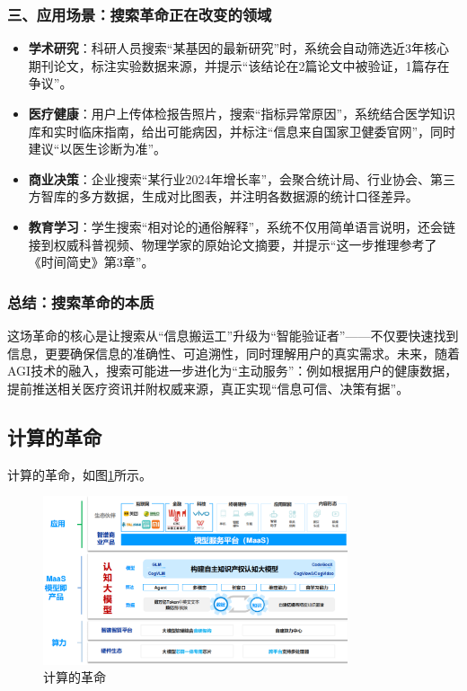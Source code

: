 \subsubsection*{三、应用场景：搜索革命正在改变的领域}

\begin{itemize}
    \item \textbf{学术研究}：科研人员搜索“某基因的最新研究”时，系统会自动筛选近3年核心期刊论文，标注实验数据来源，并提示“该结论在2篇论文中被验证，1篇存在争议”。  
    \item \textbf{医疗健康}：用户上传体检报告照片，搜索“指标异常原因”，系统结合医学知识库和实时临床指南，给出可能病因，并标注“信息来自国家卫健委官网”，同时建议“以医生诊断为准”。  
    \item \textbf{商业决策}：企业搜索“某行业2024年增长率”，会聚合统计局、行业协会、第三方智库的多方数据，生成对比图表，并注明各数据源的统计口径差异。  
    \item \textbf{教育学习}：学生搜索“相对论的通俗解释”，系统不仅用简单语言说明，还会链接到权威科普视频、物理学家的原始论文摘要，并提示“这一步推理参考了《时间简史》第3章”。  
\end{itemize}


\subsubsection*{总结：搜索革命的本质}

这场革命的核心是让搜索从“信息搬运工”升级为“智能验证者”——不仅要快速找到信息，更要确保信息的准确性、可追溯性，同时理解用户的真实需求。未来，随着AGI技术的融入，搜索可能进一步进化为“主动服务”：例如根据用户的健康数据，提前推送相关医疗资讯并附权威来源，真正实现“信息可信、决策有据”。

\subsection{计算的革命}

计算的革命，如图\ref{fig:computerevolution}所示。

\begin{figure}[H]
	\centering
	\includegraphics[width=0.8\textwidth]{figures/chapter1/fig18.png}
	\caption{计算的革命}
	\label{fig:computerevolution}
\end{figure}

